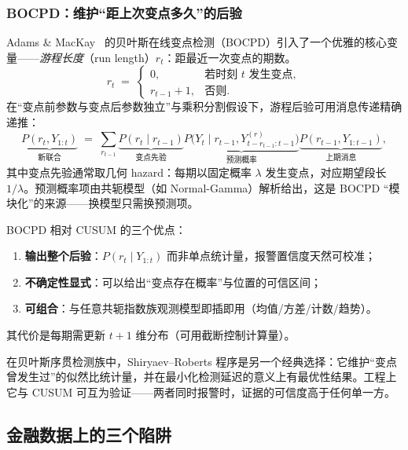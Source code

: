 \subsubsection{BOCPD：维护“距上次变点多久”的后验}

Adams \& MacKay~\cite{adams2007} 的贝叶斯在线变点检测（BOCPD）引入了一个优雅的核心变量——\emph{游程长度}（run length）$r_t$：距最近一次变点的期数。
\begin{equation}
r_t \;=\;
\begin{cases}
0, & \text{若时刻 } t \text{ 发生变点},\\
r_{t-1} + 1, & \text{否则}.
\end{cases}
\end{equation}
在“变点前参数与变点后参数独立”与乘积分割假设下，游程后验可用消息传递精确递推：
\begin{equation}
\underbrace{P(r_t, Y_{1:t})}_{\text{新联合}} \;=\; \sum_{r_{t-1}} \underbrace{P(r_t \mid r_{t-1})}_{\text{变点先验}}
\underbrace{P\big(Y_t \mid r_{t-1}, Y^{(r)}_{t-r_{t-1}:t-1}\big)}_{\text{预测概率}}
\underbrace{P(r_{t-1}, Y_{1:t-1})}_{\text{上期消息}},
\label{eq:bocpd}
\end{equation}
其中变点先验通常取几何 hazard：每期以固定概率 $\lambda$ 发生变点，对应期望段长 $1/\lambda$。预测概率项由共轭模型（如 Normal-Gamma）解析给出，这是 BOCPD “模块化”的来源——换模型只需换预测项。

BOCPD 相对 CUSUM 的三个优点：
\begin{enumerate}[itemsep=2pt]
\item \textbf{输出整个后验}：$P(r_t \mid Y_{1:t})$ 而非单点统计量，报警置信度天然可校准；
\item \textbf{不确定性显式}：可以给出“变点存在概率”与位置的可信区间；
\item \textbf{可组合}：与任意共轭指数族观测模型即插即用（均值/方差/计数/趋势）。
\end{enumerate}
其代价是每期需更新 $t+1$ 维分布（可用截断控制计算量）。

\begin{remark}
在贝叶斯序贯检测族中，Shiryaev--Roberts 程序是另一个经典选择：它维护“变点曾发生过”的似然比统计量，并在最小化检测延迟的意义上有最优性结果。工程上它与 CUSUM 可互为验证——两者同时报警时，证据的可信度高于任何单一方。
\end{remark}

\subsection{金融数据上的三个陷阱}

